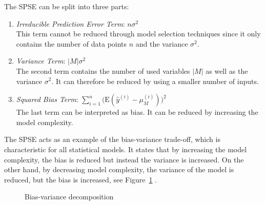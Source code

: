 \documentclass[10pt,a4paper]{report}
\begin{document}
The SPSE can be split into three parts:

\begin{enumerate}
	\item \emph{Irreducible Prediction Error Term}: $n\sigma^2$ \\
	This term cannot be reduced through model selection techniques since it only contains the number of data points $n$ and the variance $\sigma^2$.

	\item \emph{Variance Term}: $\vert M \vert \sigma^2$ \\
	The second term contains the number of used variables $\vert M \vert$ as well as the variance $\sigma^2$. It can therefore be reduced by using a smaller number of inputs.
	
	\item \emph{Squared Bias Term}: $\sum_{i=1}^{n} \big( \text{E}(\hat y^{(i)} - \mu^{(i)}_M) \big)^2$\\
	The last term can be interpreted as bias. It can be reduced by increasing the model complexity.
\end{enumerate}
%
The SPSE acts as an example of the bias-variance trade-off, which is characteristic for all statistical models. It states that by increasing the model complexity, the bias is reduced but instead the variance is increased. On the other hand, by decreasing model complexity, the variance of the model is reduced, but the bias is increased, see Figure~\ref{fig:bv-decomposition} \cite{bishop2006patternRecognition}.

\begin{figure}[H]
	\centering
	\caption{Bias-variance decomposition}
	\label{fig:bv-decomposition}
\end{figure}
\end{document}
